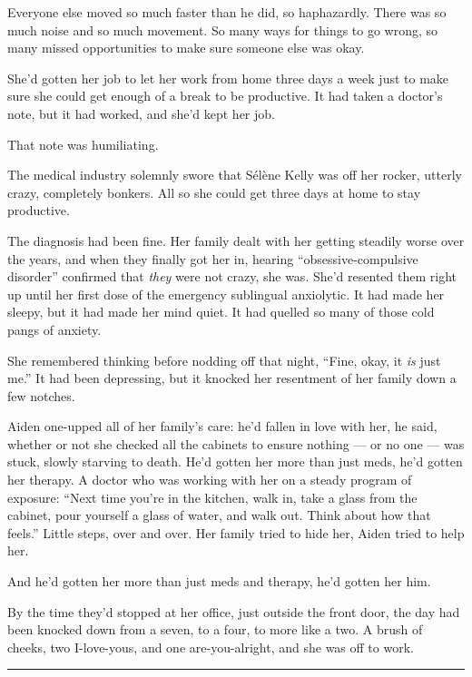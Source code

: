 Everyone else moved so much faster than he did, so haphazardly. There was so much noise and so much movement. So many ways for things to go wrong, so many missed opportunities to make sure someone else was okay.

She'd gotten her job to let her work from home three days a week just to make sure she could get enough of a break to be productive. It had taken a doctor's note, but it had worked, and she'd kept her job.

That note was humiliating.

The medical industry solemnly swore that Sélène Kelly was off her rocker, utterly crazy, completely bonkers. All so she could get three days at home to stay productive.

The diagnosis had been fine. Her family dealt with her getting steadily worse over the years, and when they finally got her in, hearing ``obsessive-compulsive disorder'' confirmed that \emph{they} were not crazy, she was. She'd resented them right up until her first dose of the emergency sublingual anxiolytic. It had made her sleepy, but it had made her mind quiet. It had quelled so many of those cold pangs of anxiety.

She remembered thinking before nodding off that night, ``Fine, okay, it \emph{is} just me.'' It had been depressing, but it knocked her resentment of her family down a few notches.

Aiden one-upped all of her family's care: he'd fallen in love with her, he said, whether or not she checked all the cabinets to ensure nothing --- or no one --- was stuck, slowly starving to death. He'd gotten her more than just meds, he'd gotten her therapy. A doctor who was working with her on a steady program of exposure: ``Next time you're in the kitchen, walk in, take a glass from the cabinet, pour yourself a glass of water, and walk out. Think about how that feels.'' Little steps, over and over. Her family tried to hide her, Aiden tried to help her.

And he'd gotten her more than just meds and therapy, he'd gotten her him.

By the time they'd stopped at her office, just outside the front door, the day had been knocked down from a seven, to a four, to more like a two. A brush of cheeks, two I-love-yous, and one are-you-alright, and she was off to work.

\begin{center}\rule{0.5\linewidth}{\linethickness}\end{center}

